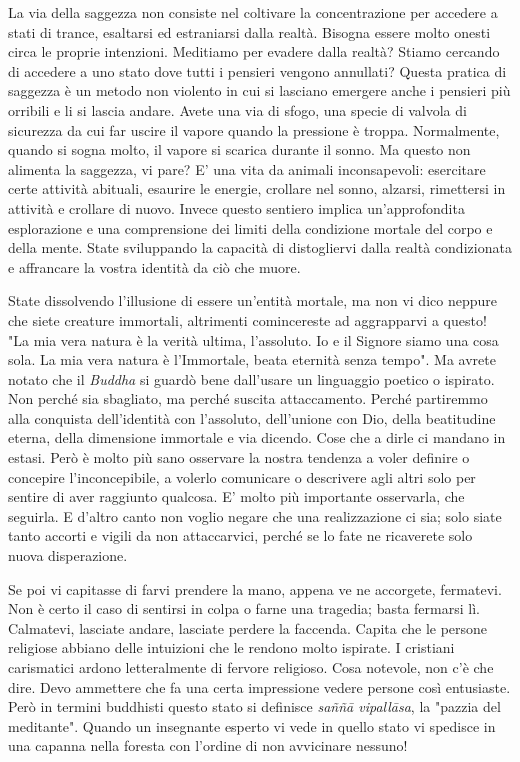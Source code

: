 La via della saggezza non consiste nel coltivare la concentrazione per
accedere a stati di trance, esaltarsi ed estraniarsi dalla realtà.
Bisogna essere molto onesti circa le proprie intenzioni. Meditiamo per
evadere dalla realtà? Stiamo cercando di accedere a uno stato dove tutti
i pensieri vengono annullati? Questa pratica di saggezza è un metodo non
violento in cui si lasciano emergere anche i pensieri più orribili e li
si lascia andare. Avete una via di sfogo, una specie di valvola di
sicurezza da cui far uscire il vapore quando la pressione è troppa.
Normalmente, quando si sogna molto, il vapore si scarica durante il
sonno. Ma questo non alimenta la saggezza, vi pare? E' una vita da
animali inconsapevoli: esercitare certe attività abituali, esaurire le
energie, crollare nel sonno, alzarsi, rimettersi in attività e crollare
di nuovo. Invece questo sentiero implica un'approfondita esplorazione e
una comprensione dei limiti della condizione mortale del corpo e della
mente. State sviluppando la capacità di distogliervi dalla realtà
condizionata e affrancare la vostra identità da ciò che muore.

State dissolvendo l'illusione di essere un'entità mortale, ma non vi
dico neppure che siete creature immortali, altrimenti comincereste ad
aggrapparvi a questo! "La mia vera natura è la verità ultima,
l'assoluto. Io e il Signore siamo una cosa sola. La mia vera natura è
l'Immortale, beata eternità senza tempo". Ma avrete notato che il \textit{Buddha}
si guardò bene dall'usare un linguaggio poetico o ispirato. Non perché
sia sbagliato, ma perché suscita attaccamento. Perché partiremmo alla
conquista dell'identità con l'assoluto, dell'unione con Dio, della
beatitudine eterna, della dimensione immortale e via dicendo. Cose che a
dirle ci mandano in estasi. Però è molto più sano osservare la nostra
tendenza a voler definire o concepire l'inconcepibile, a volerlo
comunicare o descrivere agli altri solo per sentire di aver raggiunto
qualcosa. E' molto più importante osservarla, che seguirla. E d'altro
canto non voglio negare che una realizzazione ci sia; solo siate tanto
accorti e vigili da non attaccarvici, perché se lo fate ne ricaverete
solo nuova disperazione.

Se poi vi capitasse di farvi prendere la mano, appena ve ne accorgete,
fermatevi. Non è certo il caso di sentirsi in colpa o farne una
tragedia; basta fermarsi lì. Calmatevi, lasciate andare, lasciate
perdere la faccenda. Capita che le persone religiose abbiano delle
intuizioni che le rendono molto ispirate. I cristiani carismatici ardono
letteralmente di fervore religioso. Cosa notevole, non c'è che dire.
Devo ammettere che fa una certa impressione vedere persone così
entusiaste. Però in termini buddhisti questo stato si definisce \textit{saññā vipallāsa},
la "pazzia del meditante". Quando un insegnante esperto vi
vede in quello stato vi spedisce in una capanna nella foresta con
l'ordine di non avvicinare nessuno!

